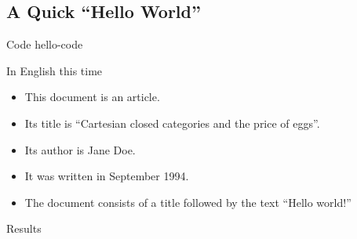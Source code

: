 \documentclass{beamer}
\begin{document}
\subsection{A Quick ``Hello World''}
\begin{frame}{Code}
  {hello-code}
\end{frame}
\begin{frame}{In English this time}
  \begin{itemize}
    \item This document is an article.
    \item Its title is ``Cartesian closed categories and the price of eggs''.
    \item Its author is Jane Doe.
    \item It was written in September 1994.
    \item The document consists of a title followed by the text ``Hello world!''

  \end{itemize}
\end{frame}
\begin{frame}{Results}
\end{frame}
\end{document}
